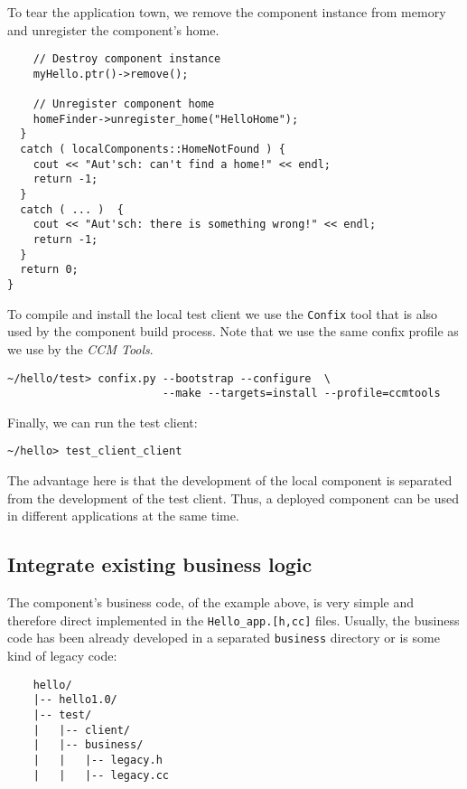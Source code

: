 \noindent
To tear the application town, we remove the component instance from memory and
unregister the component's home.
\begin{small}	
\begin{verbatim}      
    // Destroy component instance
    myHello.ptr()->remove();

    // Unregister component home
    homeFinder->unregister_home("HelloHome");
  }
  catch ( localComponents::HomeNotFound ) {
    cout << "Aut'sch: can't find a home!" << endl;
    return -1;
  }
  catch ( ... )  {
    cout << "Aut'sch: there is something wrong!" << endl;
    return -1;
  }
  return 0;
}
\end{verbatim}
\end{small}


\noindent
To compile and install the local test client we use the {\tt Confix} tool that
is also used by the component build process. Note that we use the same confix
profile as we use by the {\it CCM Tools}.
\begin{verbatim}
~/hello/test> confix.py --bootstrap --configure  \
                        --make --targets=install --profile=ccmtools
\end{verbatim}

\noindent
Finally, we can run the test client:
\begin{verbatim}
~/hello> test_client_client
\end{verbatim}
The advantage here is that the development of the local component is separated
from the development of the test client. Thus, a deployed component can be used
in different applications at the same time.


\subsection{Integrate existing business logic}

The component's business code, of the example above, is very simple and
therefore direct implemented in the {\tt Hello\_app.[h,cc]} files. Usually, the
business code has been already developed in a separated {\tt business} directory
or is some kind of legacy code:
\begin{verbatim}
    hello/
    |-- hello1.0/
    |-- test/
    |   |-- client/
    |   |-- business/
    |   |   |-- legacy.h
    |   |   |-- legacy.cc
\end{verbatim}

